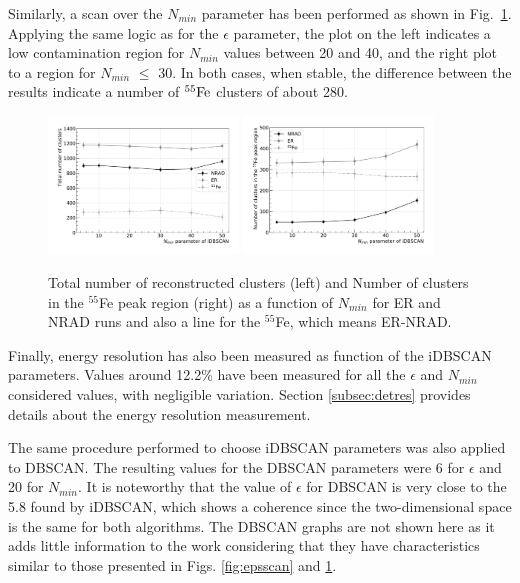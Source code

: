 \documentclass[a4paper,11pt]{article}
\begin{document}
Similarly, a scan over the $N_{min}$ parameter has been performed as shown in Fig.~\ref{fig:minscan}. Applying the same logic as for the $\epsilon$ parameter, the plot on the left indicates a low contamination region for $N_{min}$ values between 20 and 40, and the right plot to a region for $N_{min}$ $\leq$ 30. In both cases, when stable, the difference between the results indicate a number of $\rm ^{55}Fe$ clusters of about 280.


\begin{figure}[ht]
\centering
\includegraphics[width=0.45\textwidth]{TotalMinScan.pdf}
\includegraphics[width=0.45\textwidth]{SpotMinScan.pdf}
\caption{Total number of reconstructed clusters (left) and Number of clusters in the $^{55}$Fe peak region (right) as a function of $N_{min}$ for ER and NRAD runs and also a line for the $^{55}$Fe, which means ER-NRAD.}
\label{fig:minscan}
\end{figure}

Finally, energy resolution has also been measured as function of the iDBSCAN parameters.
Values around 12.2\% have been measured for all the $\epsilon$ and $N_{min}$ considered values, with negligible variation. Section \ref{subsec:detres} provides details about the energy resolution measurement. 

\hspace{0pt}

The same procedure performed to choose iDBSCAN parameters was also applied to DBSCAN. The resulting values for the DBSCAN parameters were 6 for $\epsilon$ and 20 for $N_{min}$. It is noteworthy that the value of $\epsilon$ for DBSCAN is very close to the 5.8 found by iDBSCAN, which shows a coherence since the two-dimensional space is the same for both algorithms. The DBSCAN graphs are not shown here as it adds little information to the work considering that they have characteristics similar to those presented in Figs. \ref{fig:epsscan} and \ref{fig:minscan}.
\end{document}
